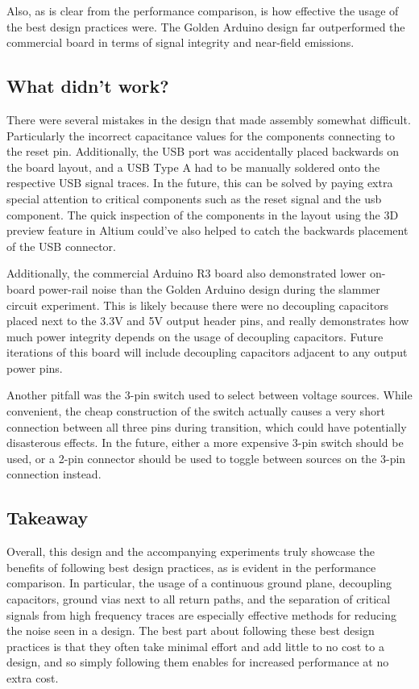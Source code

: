 \documentclass{article}
\newcommand*{\Indent}{\hspace*{1cm}}
\begin{document}
\Indent Also, as is clear from the performance comparison, is how effective the usage of the best design practices were. The Golden Arduino design far outperformed the commercial board in terms of signal integrity and near-field emissions.

\subsection{What didn't work?}
\Indent There were several mistakes in the design that made assembly somewhat difficult. Particularly the incorrect capacitance values for the components connecting to the reset pin. Additionally, the USB port was accidentally placed backwards on the board layout, and a USB Type A had to be manually soldered onto the respective USB signal traces. In the future, this can be solved by paying extra special attention to critical components such as the reset signal and the usb component. The quick inspection of the components in the layout using the 3D preview feature in Altium could've also helped to catch the backwards placement of the USB connector.

\Indent Additionally, the commercial Arduino R3 board also demonstrated lower on-board power-rail noise than the Golden Arduino design during the slammer circuit experiment. This is likely because there were no decoupling capacitors placed next to the 3.3V and 5V output header pins, and really demonstrates how much power integrity depends on the usage of decoupling capacitors. Future iterations of this board will include decoupling capacitors adjacent to any output power pins.

\Indent Another pitfall was the 3-pin switch used to select between voltage sources. While convenient, the cheap construction of the switch actually causes a very short connection between all three pins during transition, which could have potentially disasterous effects. In the future, either a more expensive 3-pin switch should be used, or a 2-pin connector should be used to toggle between sources on the 3-pin connection instead.

\subsection{Takeaway}
\Indent Overall, this design and the accompanying experiments truly showcase the benefits of following best design practices, as is evident in the performance comparison. In particular, the usage of a continuous ground plane, decoupling capacitors, ground vias next to all return paths, and the separation of critical signals from high frequency traces are especially effective methods for reducing the noise seen in a design. The best part about following these best design practices is that they often take minimal effort and add little to no cost to a design, and so simply following them enables for increased performance at no extra cost.
\end{document}
